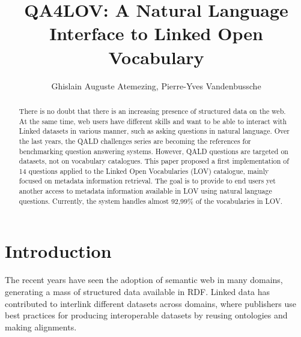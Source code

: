 \documentclass[runningheads,a4paper]{llncs}
\begin{document}
\title{QA4LOV: A Natural Language Interface to Linked Open Vocabulary}

\author{ Ghislain Auguste Atemezing, Pierre-Yves Vandenbussche }


\maketitle



\begin{abstract}

There is no doubt that there is an increasing presence of structured data on the web. At the same time, web users have different skills and want to be able to interact with Linked datasets in various manner, such as asking questions in natural language. Over the last years, the QALD challenges series are becoming the references for benchmarking question answering systems. However, QALD questions are targeted on datasets, not on vocabulary catalogues. 
This paper proposed a first implementation of 14 questions applied to the Linked Open Vocabularies (LOV) catalogue, mainly focused on metadata information retrieval. The goal is to provide to end users yet another access to metadata information available in LOV  using natural language questions. Currently, the system handles almost 92,99\% of the vocabularies in LOV.


\end{abstract}




\section{Introduction}\label{sec:introduction}
The recent years have seen the adoption of semantic web in many domains, generating a mass of structured data available in RDF. Linked data has contributed to interlink different datasets across domains, where publishers use best practices for producing interoperable datasets by reusing ontologies and making alignments. 
\end{document}
